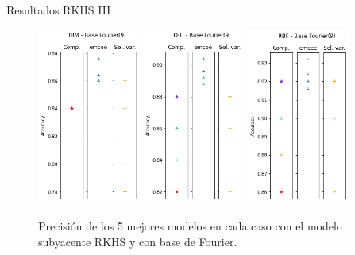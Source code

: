 \documentclass[10pt, spanish, professionalfonts]{beamer}
\begin{document}
\begin{frame}{Resultados RKHS III}
  \begin{figure}
    \includegraphics[width=0.3\textwidth]{img/results/log_rkhs_fbm_base9}\hfill
    \includegraphics[width=0.3\textwidth]{img/results/log_rkhs_ou_base9}\hfill
    \includegraphics[width=0.3\textwidth]{img/results/log_rkhs_rbf_base9}
    \caption{Precisión de los 5 mejores modelos en cada caso con el modelo subyacente RKHS y con base de Fourier.}
  \end{figure}
\end{frame}
\end{document}
